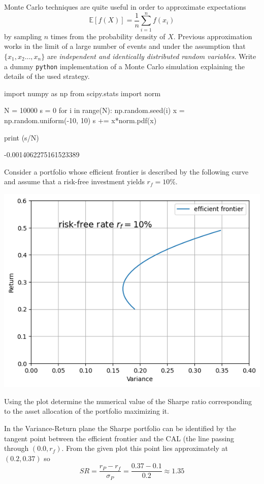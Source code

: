 \documentclass[12pt,a4paper]{exam}
\begin{document}
\begin{questions}
\question
Monte Carlo techniques are quite useful in order to approximate expectations
\begin{equation*}
\mathbb{E}[f(X)] = \frac{1}{n}\sum_{i=1}^n f(x_i)
\end{equation*} 
by sampling $n$ times from the probability density of $X$.
Previous approximation works in the limit of a large number of events and under the assumption that $\{x_1, x_2\ldots,x_n\}$ are \emph{independent and identically distributed random variables}.
Write a dummy \texttt{python} implementation of a Monte Carlo simulation explaining the details of the used strategy.
\makeemptybox{5cm}
\begin{solution}
\begin{ipython}
import numpy as np
from scipy.stats import norm

N = 10000
s = 0
for i in range(N):
    np.random.seed(i)
    x = np.random.uniform(-10, 10)
    s += x*norm.pdf(x)

print (s/N)
\end{ipython}
\begin{ioutput}
-0.0014062275161523389
\end{ioutput}
\end{solution}

\question
Consider a portfolio whose efficient frontier is described by the following curve and assume that a risk-free investment yields $r_f = 10\%$.
\begin{center}
  \includegraphics[width=0.7\linewidth]{efficient_frontier}
\end{center}
Using the plot determine the numerical value of the Sharpe ratio corresponding to the asset allocation of the portfolio maximizing it.
\fillwithlines{3cm}
\begin{solution}
In the Variance-Return plane the Sharpe portfolio can be identified by the tangent point between the efficient frontier and the CAL (the line passing through $(0.0, r_f)$. From the given plot this point lies approximately at $(0.2, 0.37)$ so
\begin{equation*}
  SR = \frac{r_P - r_f}{\sigma_P} = \frac{0.37-0.1}{0.2} \approx 1.35
\end{equation*}
\end{solution}


\end{questions}
\end{document}
